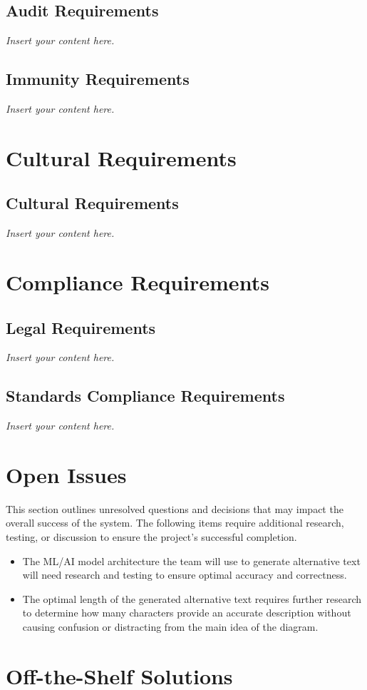 \documentclass[12pt]{article}
\newcommand{\lips}{\textit{Insert your content here.}}
\begin{document}
\subsection{Audit Requirements}
\lips
\subsection{Immunity Requirements}
\lips

\section{Cultural Requirements}
\subsection{Cultural Requirements}
\lips

\section{Compliance Requirements}
\subsection{Legal Requirements}
\lips
\subsection{Standards Compliance Requirements}
\lips

\section{Open Issues}
This section outlines unresolved questions and decisions that may impact the overall success of the system.
The following items require additional research, testing, or discussion to ensure the project’s successful completion. 
\begin{itemize}
  \item The ML/AI model architecture the team will use to generate alternative text will need research and testing 
  to ensure optimal accuracy and correctness.
  \item The optimal length of the generated alternative text requires further research to determine how many characters provide an 
  accurate description without causing confusion or distracting from the main idea of the diagram.
\end{itemize}

\section{Off-the-Shelf Solutions}
\end{document}
